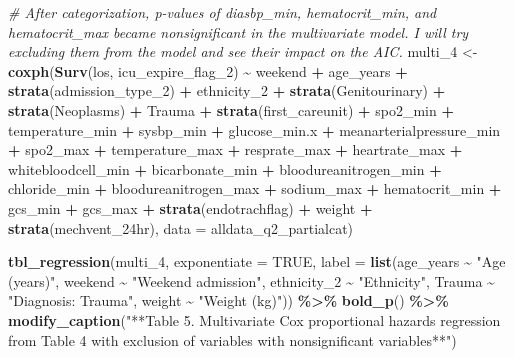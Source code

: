 \documentclass[
]{article}
\newenvironment{Shaded}{\begin{snugshade}}{\end{snugshade}}
\newcommand{\AttributeTok}[1]{\textcolor[rgb]{0.13,0.29,0.53}{#1}}
\newcommand{\CommentTok}[1]{\textcolor[rgb]{0.56,0.35,0.01}{\textit{#1}}}
\newcommand{\ConstantTok}[1]{\textcolor[rgb]{0.56,0.35,0.01}{#1}}
\newcommand{\FunctionTok}[1]{\textcolor[rgb]{0.13,0.29,0.53}{\textbf{#1}}}
\newcommand{\NormalTok}[1]{#1}
\newcommand{\OtherTok}[1]{\textcolor[rgb]{0.56,0.35,0.01}{#1}}
\newcommand{\SpecialCharTok}[1]{\textcolor[rgb]{0.81,0.36,0.00}{\textbf{#1}}}
\newcommand{\StringTok}[1]{\textcolor[rgb]{0.31,0.60,0.02}{#1}}
\begin{document}
\begin{Shaded}
\begin{Highlighting}[]
\CommentTok{\# After categorization, p{-}values of \textasciigrave{}diasbp\_min\textasciigrave{}, \textasciigrave{}hematocrit\_min\textasciigrave{}, and \textasciigrave{}hematocrit\_max\textasciigrave{} became nonsignificant in the multivariate model. I will try excluding them from the model and see their impact on the AIC.}
\NormalTok{multi\_4 }\OtherTok{\textless{}{-}} \FunctionTok{coxph}\NormalTok{(}\FunctionTok{Surv}\NormalTok{(los, icu\_expire\_flag\_2) }\SpecialCharTok{\textasciitilde{}}\NormalTok{ weekend }\SpecialCharTok{+}\NormalTok{ age\_years }\SpecialCharTok{+} \FunctionTok{strata}\NormalTok{(admission\_type\_2) }\SpecialCharTok{+}\NormalTok{ ethnicity\_2 }\SpecialCharTok{+} \FunctionTok{strata}\NormalTok{(Genitourinary) }\SpecialCharTok{+} \FunctionTok{strata}\NormalTok{(Neoplasms) }\SpecialCharTok{+}\NormalTok{ Trauma }\SpecialCharTok{+} \FunctionTok{strata}\NormalTok{(first\_careunit) }\SpecialCharTok{+}\NormalTok{ spo2\_min }\SpecialCharTok{+}\NormalTok{ temperature\_min }\SpecialCharTok{+}\NormalTok{ sysbp\_min  }\SpecialCharTok{+}\NormalTok{ glucose\_min.x }\SpecialCharTok{+}\NormalTok{ meanarterialpressure\_min }\SpecialCharTok{+}\NormalTok{ spo2\_max }\SpecialCharTok{+}\NormalTok{ temperature\_max }\SpecialCharTok{+}\NormalTok{ resprate\_max }\SpecialCharTok{+}\NormalTok{ heartrate\_max }\SpecialCharTok{+}\NormalTok{ whitebloodcell\_min }\SpecialCharTok{+}\NormalTok{ bicarbonate\_min }\SpecialCharTok{+}\NormalTok{ bloodureanitrogen\_min }\SpecialCharTok{+}\NormalTok{ chloride\_min }\SpecialCharTok{+}\NormalTok{ bloodureanitrogen\_max }\SpecialCharTok{+}\NormalTok{ sodium\_max }\SpecialCharTok{+}\NormalTok{ hematocrit\_min }\SpecialCharTok{+}\NormalTok{ gcs\_min }\SpecialCharTok{+}\NormalTok{ gcs\_max }\SpecialCharTok{+} \FunctionTok{strata}\NormalTok{(endotrachflag) }\SpecialCharTok{+}\NormalTok{ weight }\SpecialCharTok{+} \FunctionTok{strata}\NormalTok{(mechvent\_24hr), }\AttributeTok{data =}\NormalTok{ alldata\_q2\_partialcat)}

\FunctionTok{tbl\_regression}\NormalTok{(multi\_4, }
               \AttributeTok{exponentiate =} \ConstantTok{TRUE}\NormalTok{,}
               \AttributeTok{label =} \FunctionTok{list}\NormalTok{(age\_years }\SpecialCharTok{\textasciitilde{}} \StringTok{"Age (years)"}\NormalTok{,}
\NormalTok{                     weekend }\SpecialCharTok{\textasciitilde{}} \StringTok{"Weekend admission"}\NormalTok{,}
\NormalTok{                     ethnicity\_2 }\SpecialCharTok{\textasciitilde{}} \StringTok{"Ethnicity"}\NormalTok{,}
\NormalTok{                     Trauma }\SpecialCharTok{\textasciitilde{}} \StringTok{"Diagnosis: Trauma"}\NormalTok{,}
\NormalTok{                     weight }\SpecialCharTok{\textasciitilde{}} \StringTok{"Weight (kg)"}\NormalTok{)) }\SpecialCharTok{\%\textgreater{}\%}
  \FunctionTok{bold\_p}\NormalTok{() }\SpecialCharTok{\%\textgreater{}\%}
  \FunctionTok{modify\_caption}\NormalTok{(}\StringTok{"**Table 5. Multivariate Cox proportional hazards regression from Table 4 with exclusion of variables with nonsignificant variables**"}\NormalTok{)}
\end{Highlighting}
\end{Shaded}
\end{document}
